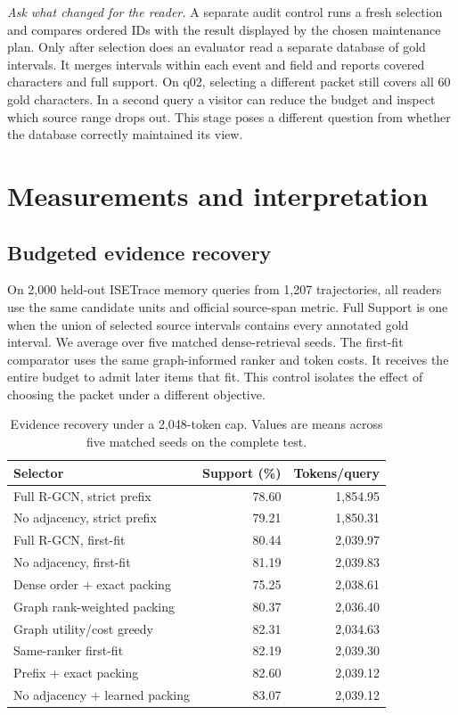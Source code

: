 \documentclass[conference]{IEEEtran}
\begin{document}
\textit{Ask what changed for the reader.} A separate audit control runs a fresh selection and compares ordered IDs with the result displayed by the chosen maintenance plan. Only after selection does an evaluator read a separate database of gold intervals. It merges intervals within each event and field and reports covered characters and full support. On q02, selecting a different packet still covers all 60 gold characters. In a second query a visitor can reduce the budget and inspect which source range drops out. This stage poses a different question from whether the database correctly maintained its view.

\section{Measurements and interpretation}
\subsection{Budgeted evidence recovery}
On 2,000 held-out ISETrace memory queries from 1,207 trajectories, all readers use the same candidate units and official source-span metric. Full Support is one when the union of selected source intervals contains every annotated gold interval. We average over five matched dense-retrieval seeds. The first-fit comparator uses the same graph-informed ranker and token costs. It receives the entire budget to admit later items that fit. This control isolates the effect of choosing the packet under a different objective.

\begin{table}[t]
\caption{Evidence recovery under a 2,048-token cap. Values are means across five matched seeds on the complete test.}
\centering\small
\begin{tabular}{lrr}\toprule
Selector & Support (\%) & Tokens/query\\\midrule
Full R-GCN, strict prefix & 78.60 & 1,854.95\\
No adjacency, strict prefix & 79.21 & 1,850.31\\
Full R-GCN, first-fit & 80.44 & 2,039.97\\
No adjacency, first-fit & 81.19 & 2,039.83\\\midrule
Dense order + exact packing & 75.25 & 2,038.61\\
Graph rank-weighted packing & 80.37 & 2,036.40\\
Graph utility/cost greedy & 82.31 & 2,034.63\\
Same-ranker first-fit & 82.19 & 2,039.30\\
Prefix + exact packing & 82.60 & 2,039.12\\
No adjacency + learned packing & 83.07 & 2,039.12\\
\bottomrule\end{tabular}
\label{tab:retrieval}
\end{table}
\end{document}
